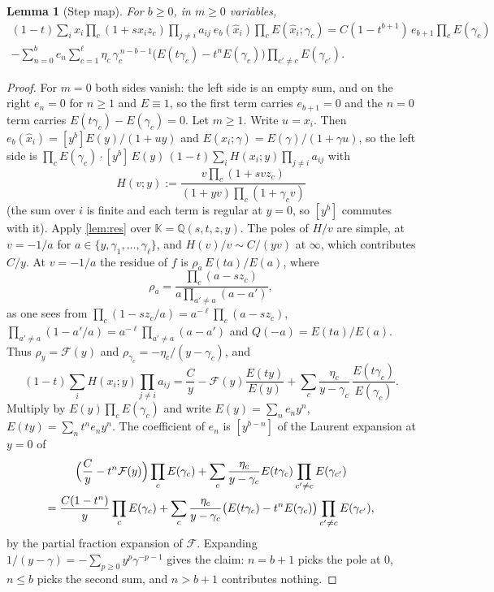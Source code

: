 \documentclass[11pt]{amsart}
\newtheorem{lemma}[theorem]{Lemma}
\theoremstyle{definition}
\theoremstyle{remark}
\numberwithin{equation}{section}
\newcommand{\hx}{\hat x}
\begin{document}
\begin{lemma}[Step map]\label{lem:step}
For $b\ge0$, in $m\ge0$ variables,
\begin{multline*}
(1-t)\sum_{i}x_i\prod_c(1+sx_iz_c)\prod_{j\neq i}a_{ij}\ e_b(\hx_i)\prod_cE(\hx_i;\gamma_c)
=C(1-t^{b+1})\,e_{b+1}\prod_cE(\gamma_c)\\
-\sum_{n=0}^{b}e_n\sum_{c=1}^\ell\eta_c\,\gamma_c^{\,n-b-1}\bigl(E(t\gamma_c)-t^nE(\gamma_c)\bigr)\prod_{c'\neq c}E(\gamma_{c'}).
\end{multline*}
\end{lemma}
\begin{proof}
For $m=0$ both sides vanish: the left side is an empty sum, and on the right $e_n=0$ for $n\ge1$ and $E\equiv1$, so the first term carries $e_{b+1}=0$ and the $n=0$ term carries $E(t\gamma_c)-E(\gamma_c)=0$. Let $m\ge1$. Write $u=x_i$. Then $e_b(\hx_i)=[y^b]E(y)/(1+uy)$ and $E(\hx_i;\gamma)=E(\gamma)/(1+\gamma u)$, so the left side is $\prod_cE(\gamma_c)\cdot[y^b]\,E(y)\,(1-t)\sum_iH(x_i;y)\prod_{j\ne i}a_{ij}$ with
\[ H(v;y):=\frac{v\prod_c(1+svz_c)}{(1+yv)\prod_c(1+\gamma_cv)} \]
(the sum over $i$ is finite and each term is regular at $y=0$, so $[y^b]$ commutes with it). Apply \cref{lem:res} over $\mathbb{K}=\mathbb{Q}(s,t,z,y)$. The poles of $H/v$ are simple, at $v=-1/a$ for $a\in\{y,\gamma_1,\dots,\gamma_\ell\}$, and $H(v)/v\sim C/(yv)$ at $\infty$, which contributes $C/y$. At $v=-1/a$ the residue of $f$ is $\rho_a\,E(ta)/E(a)$, where
\[ \rho_a=\frac{\prod_c(a-sz_c)}{a\prod_{a'\neq a}(a-a')} , \]
as one sees from $\prod_c(1-sz_c/a)=a^{-\ell}\prod_c(a-sz_c)$, $\prod_{a'\neq a}(1-a'/a)=a^{-\ell}\prod_{a'\ne a}(a-a')$ and $Q(-a)=E(ta)/E(a)$. Thus $\rho_y=\mathcal{F}(y)$ and $\rho_{\gamma_c}=-\eta_c/(y-\gamma_c)$, and
\[ (1-t)\sum_iH(x_i;y)\prod_{j\ne i}a_{ij}=\frac Cy-\mathcal F(y)\frac{E(ty)}{E(y)}+\sum_c\frac{\eta_c}{y-\gamma_c}\,\frac{E(t\gamma_c)}{E(\gamma_c)} . \]
Multiply by $E(y)\prod_cE(\gamma_c)$ and write $E(y)=\sum_ne_ny^n$, $E(ty)=\sum_nt^ne_ny^n$. The coefficient of $e_n$ is $[y^{b-n}]$ of the Laurent expansion at $y=0$ of
\begin{multline*} \Bigl(\frac Cy-t^n\mathcal F(y)\Bigr)\prod_cE(\gamma_c)+\sum_c\frac{\eta_c}{y-\gamma_c}E(t\gamma_c)\prod_{c'\ne c}E(\gamma_{c'})\\=\frac{C(1-t^n)}{y}\prod_cE(\gamma_c)+\sum_c\frac{\eta_c}{y-\gamma_c}\bigl(E(t\gamma_c)-t^nE(\gamma_c)\bigr)\prod_{c'\ne c}E(\gamma_{c'}), \end{multline*}
by the partial fraction expansion of $\mathcal F$. Expanding $1/(y-\gamma)=-\sum_{p\ge0}y^p\gamma^{-p-1}$ gives the claim: $n=b+1$ picks the pole at $0$, $n\le b$ picks the second sum, and $n>b+1$ contributes nothing.
\end{proof}
\end{document}

